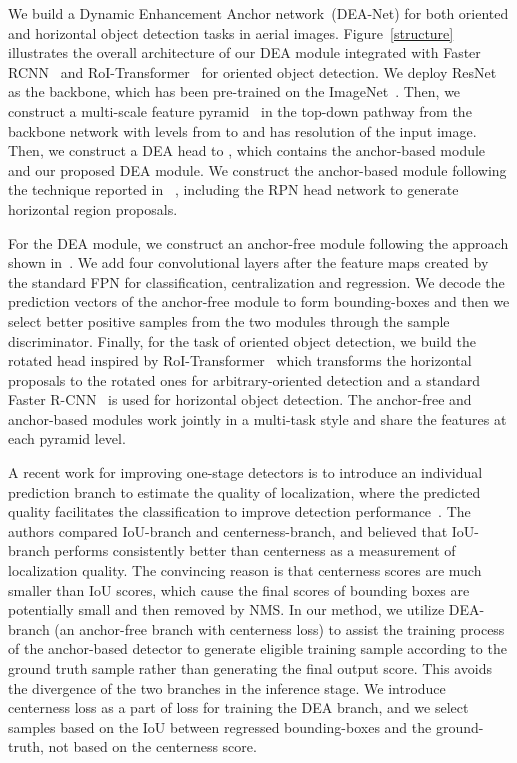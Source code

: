 \documentclass[journal]{IEEEtran}
\begin{document}
We build a Dynamic Enhancement Anchor network~(DEA-Net) for both oriented and horizontal object detection tasks in aerial images. Figure~\ref{structure} illustrates the overall architecture of our DEA module integrated with Faster RCNN~\cite{ren2016faster} and RoI-Transformer~\cite{ding2019learning} for oriented object detection. We deploy ResNet~\cite{he2016deep} as the backbone, which has been pre-trained on the ImageNet~\cite{deng2009imagenet}. Then, we construct a multi-scale feature pyramid~\cite{lin2017feature} in the top-down pathway from the backbone network with levels from  to  and  has  resolution of the input image. Then, we construct a DEA head to , which contains the anchor-based module and our proposed DEA module. We construct the anchor-based module following the technique reported in ~\cite{ren2016faster}, including the RPN head network to generate horizontal region proposals.

For the DEA module, we construct an anchor-free module following the approach shown in~\cite{tian2019fcos}. We add four convolutional layers after the feature maps  created by the standard FPN for classification, centralization and regression.  We decode the prediction vectors of the anchor-free module to form bounding-boxes and then we select better positive samples from the two modules through the sample discriminator. Finally, for the task of oriented object detection, we build the rotated head inspired by RoI-Transformer~\cite{ding2019learning} which transforms the horizontal proposals to the rotated ones for arbitrary-oriented detection and a standard Faster R-CNN~\cite{ren2016faster} is used for horizontal object detection. 
The anchor-free and anchor-based modules work jointly in a multi-task style and share the features at each pyramid level.

A recent work for improving one-stage detectors is to introduce an individual prediction branch to estimate the quality of localization, where the predicted quality facilitates the classification to improve detection performance~\cite{li2020generalized}. The authors compared IoU-branch and centerness-branch, and believed that IoU-branch performs consistently better than centerness as a measurement of localization quality. The convincing reason is that centerness scores are much smaller than IoU scores, which cause the final scores of bounding boxes are potentially small and then removed by NMS. In our method, we utilize DEA-branch (an anchor-free branch with centerness loss) to assist the training process of the anchor-based detector to generate eligible training sample according to the ground truth sample rather than generating the final output score. This avoids the divergence of the two branches in the inference stage. We introduce centerness loss as a part of loss for training the DEA branch, and we select samples based on the IoU between regressed bounding-boxes and the ground-truth, not based on the centerness score.
\end{document}
